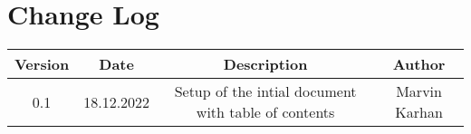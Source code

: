 \chapter{Change Log}

\begin{center}
  \begin{tabular}{| c | c | c | c|} 
   \hline
   Version & Date & Description & Author \\ [0.5ex] 
   \hline
   0.1 & 18.12.2022 & Setup of the intial document with table of contents & Marvin Karhan \\ 
   \hline
  \end{tabular}
  \end{center}